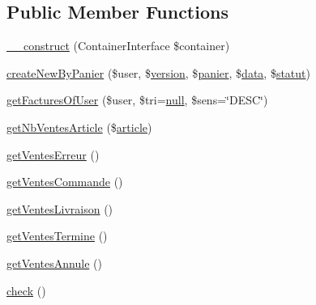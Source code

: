 \subsection*{Public Member Functions}
\begin{DoxyCompactItemize}
\item 
\hyperlink{class_acme_group_1_1services_1_1entities_services_1_1facture_aca26167ff31a90bbe404424625dc872b}{\+\_\+\+\_\+construct} (Container\+Interface \$container)
\item 
\hyperlink{class_acme_group_1_1services_1_1entities_services_1_1facture_aad45387d839a72f1f34c022cb9e6e93d}{create\+New\+By\+Panier} (\$user, \$\hyperlink{class_acme_group_1_1_labo_bundle_1_1_entity_1_1version}{version}, \$\hyperlink{class_acme_group_1_1_labo_bundle_1_1_entity_1_1panier}{panier}, \$\hyperlink{fullpage_2plugin_8js_a718c1bf5a3bf21ebb980203b142e5b75}{data}, \$\hyperlink{class_acme_group_1_1_labo_bundle_1_1_entity_1_1statut}{statut})
\item 
\hyperlink{class_acme_group_1_1services_1_1entities_services_1_1facture_afb9d35a879c351572ccc45f39b07c103}{get\+Factures\+Of\+User} (\$user, \$tri=\hyperlink{validate_8js_afb8e110345c45e74478894341ab6b28e}{null}, \$sens=\char`\"{}D\+E\+S\+C\char`\"{})
\item 
\hyperlink{class_acme_group_1_1services_1_1entities_services_1_1facture_ac7aa310802cb0102b15cee525ddbfd64}{get\+Nb\+Ventes\+Article} (\$\hyperlink{class_acme_group_1_1_labo_bundle_1_1_entity_1_1article}{article})
\item 
\hyperlink{class_acme_group_1_1services_1_1entities_services_1_1facture_aaf763657154f17cdc46e171752810283}{get\+Ventes\+Erreur} ()
\item 
\hyperlink{class_acme_group_1_1services_1_1entities_services_1_1facture_a3f5788921be97a5d29ff05f00e51432f}{get\+Ventes\+Commande} ()
\item 
\hyperlink{class_acme_group_1_1services_1_1entities_services_1_1facture_a9b88524b74fb5291fa0db6954530e2f2}{get\+Ventes\+Livraison} ()
\item 
\hyperlink{class_acme_group_1_1services_1_1entities_services_1_1facture_afce67468ce5a7e0e42c7ec0afa675dbf}{get\+Ventes\+Termine} ()
\item 
\hyperlink{class_acme_group_1_1services_1_1entities_services_1_1facture_af496a2c1db8b95bf3a4636ba5db17b4c}{get\+Ventes\+Annule} ()
\item 
\hyperlink{class_acme_group_1_1services_1_1entities_services_1_1facture_a52da94b15fd38e1af1e5fc06c1adc61f}{check} ()
\end{DoxyCompactItemize}
